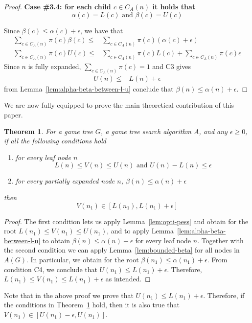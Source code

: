\documentclass[letterpaper]{article} %
\newtheorem{theorem}{Theorem}
\newcommand{\MM}{\mathit{V}}
\newcommand{\pess}{\mathit{L}}
\newcommand{\opti}{\mathit{U}}
\newcommand{\rootnode}{\mathit{n_1}}
\begin{document}
\begin{proof}
\textbf{Case \#3.4: for each child $c\in C_A(n)$ it holds that
\[ \alpha(c)=\pess(c) \text{ and } \beta(c)=\opti(c)\]}

\noindent Since $\beta(c)\leq \alpha(c)+\epsilon$, we have that
\begin{align}
\sum_{c\in C_A(n)} \!\!\pi(c) \beta(c) \leq & \sum_{c\in C_A(n)} \pi(c)(\alpha(c) + \epsilon)\\
\sum_{c\in C_A(n)} \!\!\!\pi(c)\opti(c) \leq & \!\!\sum_{c\in C_A(n)} \!\!\!\!\pi(c)\pess(c) + \!\!\!\sum_{c\in C_A(n)} \!\!\!\!\pi(c)\epsilon \label{eq:opti-pess-eps}
\end{align}
Since $n$ is fully expanded, $\sum_{c\in C_A(n)} \pi(c) = 1$ and C3 gives
\begin{align}
\opti(n) \leq & \pess(n) + \epsilon \label{eq:opti-pess-eps}
\end{align}
from Lemma~\ref{lem:alpha-beta-between-l-u} conclude that $\beta(n) \leq \alpha(n) + \epsilon$.
\end{proof}


We are now fully equipped to prove the main theoretical contribution of this paper.

\begin{theorem}
For a game tree $G$, a game tree search algorithm $A$, 
and any $\epsilon\geq 0$, if all the following conditions hold
\begin{enumerate}
\item for every leaf node $n$
\[ \pess(n) \leq \MM(n) \leq \opti(n) \text{ and } \opti(n)-\pess(n)\leq \epsilon \]
\item for every partially expanded node $n$, 
$\beta(n) \leq \alpha(n)+\epsilon$
\end{enumerate}
then 
\[\MM(\rootnode)\in [\pess(\rootnode),\pess(\rootnode)+\epsilon]\]
\label{the:basic}
\end{theorem}
\begin{proof}
The first condition lets us apply Lemma~\ref{lem:opti-pess} and obtain for the root $\pess(n_1) \leq \MM(n_1) \leq \opti(n_1)$, and to apply Lemma~\ref{lem:alpha-beta-between-l-u} to obtain $\beta(n) \leq \alpha(n) + \epsilon$ for every leaf node $n$. 
Together with the second condition we can apply Lemma~\ref{lem:bounded-beta} for all nodes in $A(G)$.
In particular, we obtain for the root $\beta(n_1) \leq \alpha(n_1) + \epsilon$.
From condition C4, we conclude that $\opti(\rootnode)\leq \pess(\rootnode)+\epsilon$.
Therefore, $\pess(\rootnode) \leq \MM(\rootnode) \leq \pess(\rootnode) + \epsilon$ as intended.
\end{proof}
Note that in the above proof we prove that $\opti(\rootnode)\leq \pess(\rootnode)+\epsilon$. Therefore, if the conditions in Theorem~\ref{the:basic} hold, then it is also true that $\MM(\rootnode)\in [\opti(\rootnode)-\epsilon,\opti(\rootnode)]$. %
\end{document}
